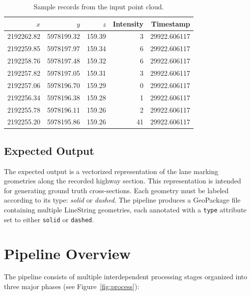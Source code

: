 \begin{table}[htbp]
  \centering
  \caption{Sample records from the input point cloud.}
  \label{tab:pointcloud_sample}
  \begin{tabular}{rrrrr}
    \hline
    $x$ & $y$ & $z$ & Intensity & Timestamp \\
    \hline
    2192262.82 & 5978199.32 & 159.39 & 3  & 29922.606117 \\
    2192259.85 & 5978197.97 & 159.34 & 6  & 29922.606117 \\
    2192258.76 & 5978197.48 & 159.32 & 6  & 29922.606117 \\
    2192257.82 & 5978197.05 & 159.31 & 3  & 29922.606117 \\
    2192257.06 & 5978196.70 & 159.29 & 0  & 29922.606117 \\
    2192256.34 & 5978196.38 & 159.28 & 1  & 29922.606117 \\
    2192255.78 & 5978196.11 & 159.26 & 2  & 29922.606117 \\
    2192255.20 & 5978195.86 & 159.26 & 41 & 29922.606117 \\
    \hline
  \end{tabular}
\end{table}

\FloatBarrier
\subsection{Expected Output}
\label{sec:expected_output}

The expected output is a vectorized representation of the lane marking geometries along the recorded highway section. This representation is intended for generating ground truth cross-sections. Each geometry must be labeled according to its type: \emph{solid} or \emph{dashed}. The pipeline produces a GeoPackage file containing multiple LineString geometries, each annotated with a \texttt{type} attribute set to either \texttt{solid} or \texttt{dashed}.

\section{Pipeline Overview}
\label{sec:pipeline_overview}

The pipeline consists of multiple interdependent processing stages organized into three major phases (see Figure~\ref{fig:process}):

